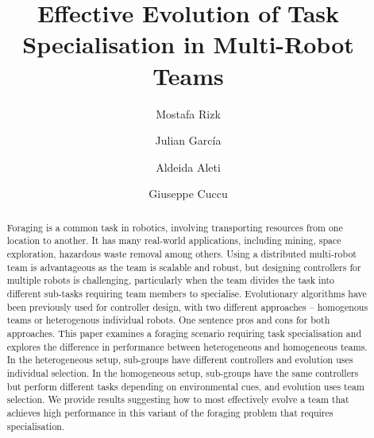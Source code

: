 \documentclass[sigconf]{aamas}  %
\begin{document}
\title{Effective Evolution of Task Specialisation in Multi-Robot Teams}  

 \author{Mostafa Rizk}

 \author{Julian Garc\'ia}

 \author{Aldeida Aleti}
 
  \author{Giuseppe Cuccu}



\begin{abstract}  %

Foraging is a common task in robotics, involving transporting resources from one location to another. 
It has many real-world applications, including mining, space exploration, hazardous waste removal among others. 
Using a distributed multi-robot team is advantageous as the team is scalable and robust, but designing controllers for multiple robots is challenging, particularly when the team divides the task into different sub-tasks requiring team members to specialise. 
Evolutionary algorithms have been previously used for controller design, with two different approaches -- homogenous teams or heterogenous individual robots. 
One sentence pros and cons for both approaches.
This paper examines a foraging scenario requiring task specialisation and explores the difference in performance between heterogeneous and homogeneous teams. 
In the heterogeneous setup, sub-groups have different controllers and evolution uses individual selection. 
In the homogeneous setup,  sub-groups have the same controllers but perform different tasks depending on environmental cues, and evolution uses team selection. 
We provide results suggesting how to most effectively evolve a team that achieves high performance in this variant of the foraging problem that requires specialisation.

\end{abstract}
\end{document}
